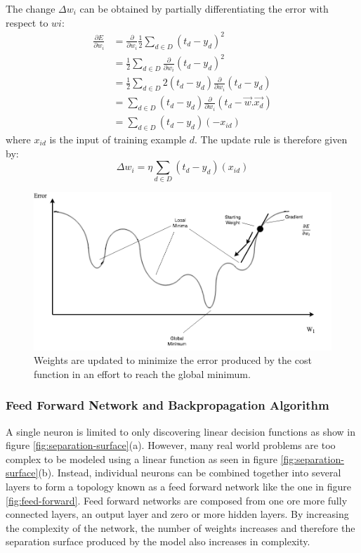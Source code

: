 \documentclass{article}
\begin{document}
	The change $\Delta w_i$ can be obtained by partially differentiating the error with respect to $wi$:
	\begin{equation}
		\begin{split}
			\frac{\partial E}{\partial w_i} & = \frac{\partial}{\partial w_i} \frac{1}{2} \sum_{d \in D} (t_d - y_d)^2\\
			& = \frac{1}{2} \sum_{d \in D} \frac{\partial}{\partial w_i} (t_d - y_d)^2\\
			& = \frac{1}{2} \sum_{d \in D} 2(t_d - y_d) \frac{\partial}{\partial w_i} (t_d - y_d) \\
			& = \sum_{d \in D} (t_d - y_d) \frac{\partial}{\partial w_i} (t_d - \vec{w}.\vec{x_d}) \\
			& = \sum_{d \in D} (t_d - y_d) (-x_{id})
		\end{split}
	\end{equation}
	where $x_{id}$ is the input of training example $d$. The update rule is therefore given by:
	\begin{equation}
		\Delta w_i = \eta \sum_{d \in D} (t_d - y_d) (x_{id})
	\end{equation}
		
	\begin{figure}
		\centering
		\includegraphics[max width=\textwidth]{gradient-descent}
		\caption{Weights are updated to minimize the error produced by the cost function in an effort to reach the global minimum.}
		\label{fig:gradient-descent}
	\end{figure}
	
	\subsubsection{Feed Forward Network and Backpropagation Algorithm}
	
	A single neuron is limited to only discovering linear decision functions as show in figure \ref{fig:separation-surface}(a). However, many real world problems are too complex to be modeled using a linear function as seen in figure \ref{fig:separation-surface}(b). Instead, individual neurons can be combined together into several layers to form a topology known as a feed forward network like the one in figure \ref{fig:feed-forward}. Feed forward networks are composed from one ore more fully connected layers, an output layer and zero or more hidden layers\cite{Mitchell}. By increasing the complexity of the network, the number of weights increases and therefore the separation surface produced by the model also increases in complexity\cite{Bengio07scalinglearning}.
	
\end{document}
